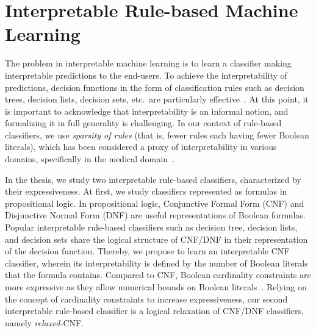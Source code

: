 \section{Interpretable Rule-based Machine Learning}
The problem in interpretable machine learning is to learn a classifier making interpretable predictions to the end-users. To achieve the interpretability of predictions, decision functions in the form of classification rules such as decision trees,  decision lists, decision sets, etc.\ are particularly effective~\cite{bessiere2009minimising,dash2021lprules,ignatiev2021reasoning,izza2020explaining,lakkaraju2017interpretable,lakkaraju2016interpretable,letham2015interpretable,narodytska2018learning,rivest1987learning,wang2015falling,yu2020optimal}.  At this point, it is important to acknowledge that interpretability is an informal notion, and formalizing it in full generality is challenging. In our context of rule-based classifiers, we use \emph{sparsity of rules} (that is, fewer rules each having fewer Boolean literals), which has been considered a proxy of interpretability in various domains, specifically in the medical domain~\cite{gage2001validation,lakkaraju2019faithful,letham2015interpretable,malioutov2013exact,myers1962myers}.





In the thesis, we study two interpretable rule-based classifiers, characterized by their expressiveness. At first, we study classifiers represented as formulas in propositional logic. In propositional logic, Conjunctive Formal Form (CNF) and Disjunctive Normal Form (DNF) are useful representations of Boolean formulas. Popular interpretable rule-based classifiers such as decision tree, decision lists, and decision sets share the logical structure of CNF/DNF in their representation of the decision function. Thereby, we propose to learn an interpretable CNF classifier, wherein its interpretability is defined by the number of Boolean literals that the formula contains. Compared to CNF, Boolean cardinality constraints are more expressive as they allow numerical bounds on Boolean literals~\cite{sinz2005towards}. Relying on the concept of cardinality constraints to increase expressiveness, our second interpretable rule-based classifier is a logical relaxation of CNF/DNF classifiers, namely \emph{relaxed-}CNF. 



